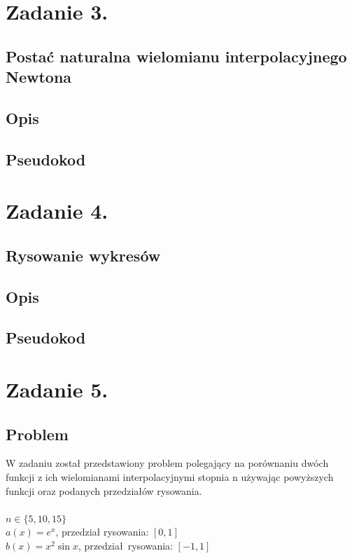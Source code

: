 \documentclass[11pt, a4paper]{article}
\begin{document}
    \section{Zadanie 3.}
    \subsection{Postać naturalna wielomianu interpolacyjnego Newtona}
    \subsection{Opis}
    \subsection{Pseudokod}
    \section{Zadanie 4.}
    \subsection{Rysowanie wykresów}
    \subsection{Opis}
    \subsection{Pseudokod}
    \section{Zadanie 5.}
    \subsection{Problem}
    W zadaniu został przedstawiony problem polegający na porównaniu dwóch funkcji z ich wielomianami interpolacyjnymi stopnia n używając powyższych funkcji oraz podanych przedziałów rysowania.\\
    \\
    $n \in \{5, 10, 15\}$\\
    $a(x) = e^{x}$, przedział rysowania: $[0,1]$\\
    $b(x) = x^2\sin{x}$, przedział rysowania: $[-1, 1]$
\end{document}
